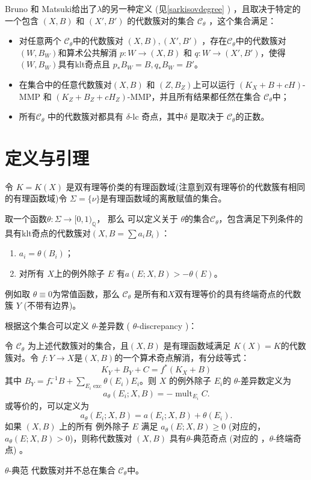 Bruno 和 Matsuki给出了$\lambda$的另一种定义 (见\ref{sarkisovdegree} ) ，且取决于特定的一个包含 $(X,B)$ 和 $(X',B')$ 的代数簇对的集合 $\mathcal{C}_{\theta}$ ，这个集合满足：
\begin{itemize}
  \item
   对任意两个  $\mathcal{C}_{\theta}$中的代数簇对 $(X,B),(X',B')$ ，存在$\mathcal{C}_{\theta}$中的代数簇对 $(W,B_W)$和算术公共解消 $p:W\to (X,B)$ 和 $q:W\to (X',B')$，使得 $(W,B_W)$具有klt奇点且 $p_*B_W=B,q_*B_W=B'$。
  \item  在集合中的任意代数簇对$(X,B)$ 和 $(Z,B_Z)$上可以运行  $(K_X+B+cH)$-MMP 和 $(K_Z+B_Z+cH_Z)$-MMP，并且所有结果都任然在集合 $\mathcal{C}_{\theta}$中；
  \item 所有$\mathcal{C}_{\theta}$ 中的代数簇对都具有 $\delta$-lc 奇点，其中$\delta$ 是取决于 $\mathcal{C}_{\theta}$的正数。 
\end{itemize}

\section{定义与引理}
令 $ K=K(X) $ 是双有理等价类的有理函数域(注意到双有理等价的代数簇有相同的有理函数域)令 $ \Sigma=\{\nu\} $是有理函数域的离散赋值的集合。
\begin{definition}\label{thetacategory}
  \cite[Definition 3.5]{brunoLogSarkisovProgram1995}
  取一个函数$\theta:\Sigma\to [0,1)_{\mathbb{Q}}$， 那么 可以定义关于  $\theta$的集合$ \mathcal{C}_{\theta} $，包含满足下列条件的具有klt奇点的代数簇对$ (X,B=\sum a_{i}B_{i}) $：
  \begin{enumerate}
    \item $ a_i=\theta(B_i) $；
    \item 对所有 $ X $上的例外除子 $E $ 有$ a(E;X,B)>-\theta(E) $。
  \end{enumerate}
\end{definition}
\begin{remark}
例如取 $\theta \equiv 0$为常值函数，那么 $\mathcal{C}_{\theta}$ 是所有和$X$双有理等价的具有终端奇点的代数簇 $Y$ (不带有边界)。
\end{remark}
  根据这个集合可以定义 $\theta$-差异数 ( $\theta$-discrepancy )：
\begin{definition}
  令 $\mathcal{C}_{\theta}$ 为上述代数簇对的集合，且$(X, B)$ 是有理函数域满足 $K(X)=K$的代数簇对。令  $f: Y\to X$是$(X, B)$的一个算术奇点解消，有分歧等式：
  \[
    K_{Y}+B_{Y}+C=f^*(K_{X}+B)
  \]
  其中 $B_{Y}=f^{-1}_*B+ \sum_{E_{i}\text{ exc}} \theta(E_{i})E_{i}$。则 $X$ 的例外除子 $E_{i}$的 $\theta$-差异数定义为
  \[
    a_{\theta}(E_{i};X,B)=-\operatorname{mult}_{E_{i}}C.
  \]
  或等价的，可以定义为
  \[
    a_{\theta}(E_{i};X,B)=a(E_{i};X,B)+\theta(E_{i}).
  \]
  如果 $(X,B)$ 上的所有 例外除子 $E$ 满足   $a_{\theta}(E;X,B)\geqslant 0$ (对应的， $a_{\theta}(E;X,B)> 0$)，则称代数簇对 $(X,B)$ 具有$\theta$-典范奇点 (对应的 ，$\theta$-终端奇点)  。
\end{definition}
\begin{remark}
 $\theta$-典范 代数簇对并不总在集合 $\mathcal{C}_{\theta}$中。
\end{remark}

